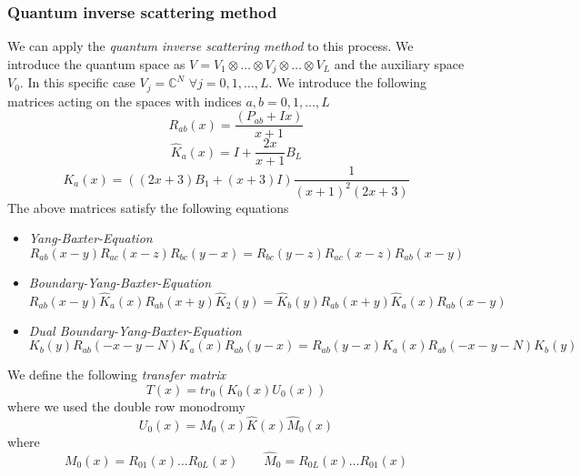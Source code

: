 \documentclass[11pt]{article}
\numberwithin{equation}{section}
\begin{document}
\subsubsection{Quantum inverse scattering method}
We can apply the \textit{quantum inverse scattering method} to this process. We introduce the quantum space as $V=V_{1}\otimes\ldots\otimes V_{j}\otimes\ldots\otimes V_{L}$ and the auxiliary space $V_{0}$. In this specific case $V_{j}=\mathbb{C}^{N}$ $\forall j=0,1,\ldots ,L$. We introduce the following matrices acting on the spaces with indices $a,b=0,1,\ldots,L$
\begin{equation}\label{Rmatrix}
R_{ab}(x)=\frac{(P_{ab}+Ix)}{x+1}
\end{equation}
\begin{equation}\label{KmatrixHAT}
\widehat{K}_{a}(x)=I+\frac{2x}{x+1}B_{L}
\end{equation}
\begin{equation}\label{Kmatrix}
K_{a}(x)=\left((2x+3)B_{1}+(x+3)I\right)\frac{1}{(x+1)^{2}(2x+3)}
\end{equation}
The above matrices satisfy the following equations
\begin{itemize}
\item \textit{Yang-Baxter-Equation}
\begin{equation}
R_{ab}(x-y)R_{ac}(x-z)R_{bc}(y-x)=R_{bc}(y-z)R_{ac}(x-z)R_{ab}(x-y)
\end{equation}
\item \textit{Boundary-Yang-Baxter-Equation}
\begin{equation}
R_{ab}(x-y)\widehat{K}_{a}(x)R_{ab}(x+y)\widehat{K}_{2}(y)=\widehat{K}_{b}(y)R_{ab}(x+y)\widehat{K}_{a}(x)R_{ab}(x-y)
\end{equation}
\item \textit{Dual Boundary-Yang-Baxter-Equation}
\begin{equation}
K_{b}(y) R_{ab}(-x-y-N) K_{a}(x)R_{ab}(y-x)=R_{ab}(y-x)K_{a}(x)R_{ab}(-x-y-N)K_{b}(y)
\end{equation}
\end{itemize}
We define the following \textit{transfer matrix}
\begin{equation}
	T(x)=tr_{0}\left(K_{0}(x)U_{0}(x)\right)
\end{equation}
where we used the double row monodromy
\begin{equation}
	U_{0}(x)=M_{0}(x)\widehat{K}(x)\widehat{M}_{0}(x)
\end{equation}
where 
\begin{equation}
	M_{0}(x)=R_{01}(x)\ldots R_{0L}(x)\qquad \widehat{M}_{0}=R_{0L}(x)\ldots R_{01}(x)
\end{equation}
\end{document}
